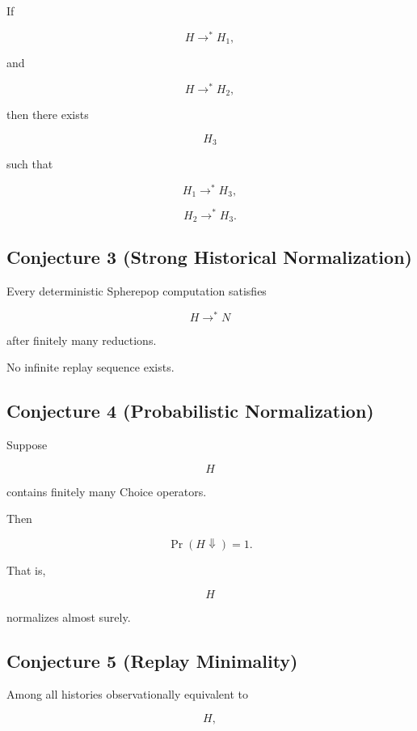 \documentclass[12pt,oneside]{article}
\theoremstyle{definition}
\theoremstyle{remark}
\begin{document}
If

\[
H
\longrightarrow^{*}
H_1,
\]

and

\[
H
\longrightarrow^{*}
H_2,
\]

then there exists

\[
H_3
\]

such that

\[
H_1
\longrightarrow^{*}
H_3,
\]

\[
H_2
\longrightarrow^{*}
H_3.
\]

\subsection*{Conjecture 3 (Strong Historical Normalization)}

Every deterministic Spherepop computation satisfies

\[
H
\longrightarrow^{*}
N
\]

after finitely many reductions.

No infinite replay sequence exists.

\subsection*{Conjecture 4 (Probabilistic Normalization)}

Suppose

\[
H
\]

contains finitely many Choice operators.

Then

\[
\Pr
\left(
H
\Downarrow
\right)
=
1.
\]

That is,

\[
H
\]

normalizes almost surely.

\subsection*{Conjecture 5 (Replay Minimality)}

Among all histories observationally equivalent to

\[
H,
\]
\end{document}
